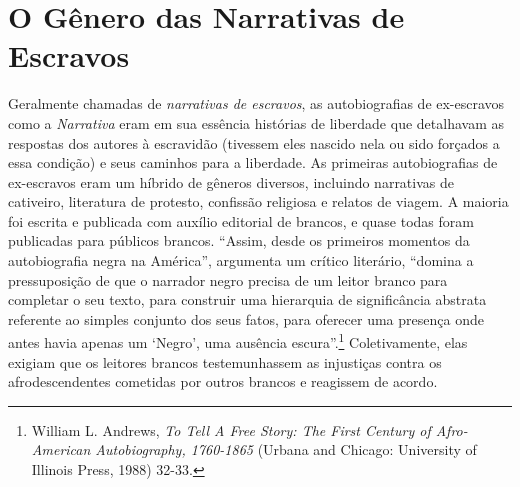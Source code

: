 \section{}\label{section-1}

\section{O Gênero das Narrativas de
Escravos}\label{o-guxeanero-das-narrativas-de-escravos}

Geralmente chamadas de \emph{narrativas de escravos}, as autobiografias
de ex-escravos como a \emph{Narrativa} eram em sua essência histórias de
liberdade que detalhavam as respostas dos autores à escravidão (tivessem
eles nascido nela ou sido forçados a essa condição) e seus caminhos para
a liberdade. As primeiras autobiografias de ex-escravos eram um híbrido
de gêneros diversos, incluindo narrativas de cativeiro, literatura de
protesto, confissão religiosa e relatos de viagem. A maioria foi escrita
e publicada com auxílio editorial de brancos, e quase todas foram
publicadas para públicos brancos. ``Assim, desde os primeiros momentos
da autobiografia negra na América'', argumenta um crítico literário,
``domina a pressuposição de que o narrador negro precisa de um leitor
branco para completar o seu texto, para construir uma hierarquia de
significância abstrata referente ao simples conjunto dos seus fatos,
para oferecer uma presença onde antes havia apenas um `Negro', uma
ausência escura''.\footnote{William L. Andrews, \emph{To Tell A Free
  Story: The First Century of Afro-American Autobiography, 1760-1865}
  (Urbana and Chicago: University of Illinois Press, 1988) 32-33.}
Coletivamente, elas exigiam que os leitores brancos testemunhassem as
injustiças contra os afrodescendentes cometidas por outros brancos e
reagissem de acordo.


